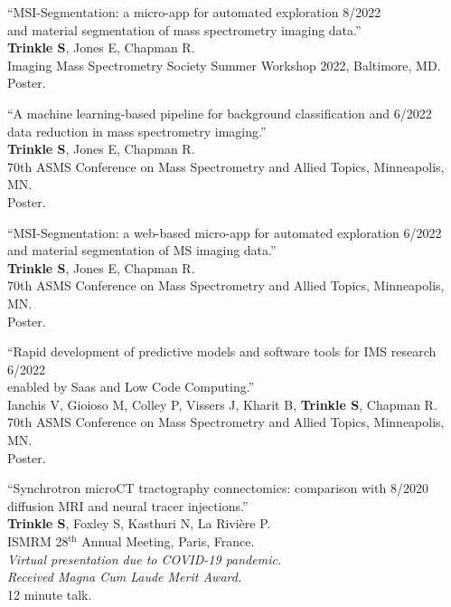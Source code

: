 \documentclass[10pt,letterpaper]{article}
\begin{document}
\begin{benumerate}{10}

\item{``MSI-Segmentation: a micro-app for automated exploration \hfill 8/2022\\ and material segmentation of mass spectrometry imaging data.''\\
    \textbf{Trinkle S}, Jones E, Chapman R.\\
    Imaging Mass Spectrometry Society Summer Workshop 2022, Baltimore, MD.\\
    Poster.}
  
\item{``A machine learning-based pipeline for background classification and \hfill 6/2022\\ data reduction in mass spectrometry imaging.''\\
    \textbf{Trinkle S}, Jones E, Chapman R.\\
    70th ASMS Conference on Mass Spectrometry and Allied Topics, Minneapolis, MN.\\
    Poster.}
  
\item{``MSI-Segmentation: a web-based micro-app for automated exploration \hfill 6/2022\\ and material segmentation of MS imaging data.''\\
    \textbf{Trinkle S}, Jones E, Chapman R.\\
    70th ASMS Conference on Mass Spectrometry and Allied Topics, Minneapolis, MN.\\
    Poster.}
  
\item{``Rapid development of predictive models and software tools for IMS research \hfill 6/2022\\ enabled by Saas and Low Code Computing.''\\
    Ianchis V, Gioioso M, Colley P, Vissers J, Kharit B, \textbf{Trinkle S}, Chapman R.\\
    70th ASMS Conference on Mass Spectrometry and Allied Topics, Minneapolis, MN.\\
    Poster.}
  
\item{``Synchrotron microCT tractography connectomics: comparison with \hfill 8/2020\\ diffusion MRI and neural tracer injections.''\\
    \textbf{Trinkle S}, Foxley S, Kasthuri N, La Rivière P.\\
    ISMRM 28$^{\text{th}}$ Annual Meeting, Paris, France.\\
    \textit{Virtual presentation due to COVID-19 pandemic.}\\
    \textit{Received Magna Cum Laude Merit Award.}\\
    12 minute talk.}


\end{benumerate}
\end{document}
